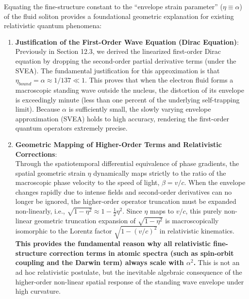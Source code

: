 \documentclass[12pt, a4paper]{article}
\begin{document}
Equating the fine-structure constant to the ``envelope strain parameter'' ($\eta \equiv \alpha$) of the fluid soliton provides a foundational geometric explanation for existing relativistic quantum phenomena:
\begin{enumerate}
    \item \textbf{Justification of the First-Order Wave Equation (Dirac Equation)}: \\
    Previously in Section 12.3, we derived the linearized first-order Dirac equation by dropping the second-order partial derivative terms (under the SVEA). The fundamental justification for this approximation is that \textbf{$\eta_{bound} = \alpha \approx 1/137 \ll 1$}. This proves that when the electron fluid forms a macroscopic standing wave outside the nucleus, the distortion of its envelope is exceedingly minute (less than one percent of the underlying self-trapping limit). Because $\alpha$ is sufficiently small, the slowly varying envelope approximation (SVEA) holds to high accuracy, rendering the first-order quantum operators extremely precise.
    
    \item \textbf{Geometric Mapping of Higher-Order Terms and Relativistic Corrections}: \\
    Through the spatiotemporal differential equivalence of phase gradients, the spatial geometric strain $\eta$ dynamically maps strictly to the ratio of the macroscopic phase velocity to the speed of light, $\beta = v/c$. When the envelope changes rapidly due to intense fields and second-order derivatives can no longer be ignored, the higher-order operator truncation must be expanded non-linearly, i.e., $\sqrt{1 - \eta^2} \approx 1 - \frac{1}{2}\eta^2$. Since $\eta$ maps to $v/c$, this purely non-linear geometric truncation expansion of $\sqrt{1 - \eta^2}$ is macroscopically isomorphic to the Lorentz factor $\sqrt{1 - (v/c)^2}$ in relativistic kinematics. \textbf{This provides the fundamental reason why all relativistic fine-structure correction terms in atomic spectra (such as spin-orbit coupling and the Darwin term) always scale with $\alpha^2$.} This is not an ad hoc relativistic postulate, but the inevitable algebraic consequence of the higher-order non-linear spatial response of the standing wave envelope under high curvature.
    

\end{enumerate}
\end{document}
